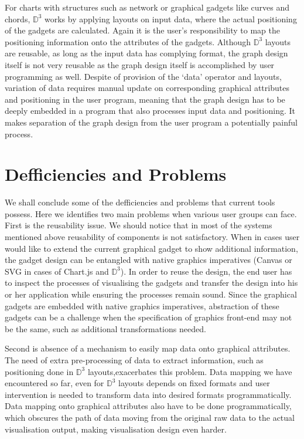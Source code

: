 \documentclass[11pt, a4paper]{report}
\begin{document}
For charts with structures such as network or graphical gadgets like curves and chords, $\mathbb D^3$ works by applying layouts on input data, where the actual positioning of the gadgets are calculated. Again it is the user's responsibility to map the positioning information onto the attributes of the gadgets. Although $\mathbb D^3$ layouts are reusable, as long as the input data has complying format, the graph design itself is not very reusable as the graph design itself is accomplished by user programming as well. Despite of provision of the `data' operator and layouts, variation of data requires manual update on corresponding graphical attributes and positioning in the user program, meaning that the graph design has to be deeply embedded in a program that also processes input data and positioning. It makes separation of the graph design from the user program a potentially painful process. 

\section{Defficiencies and Problems}
We shall conclude some of the defficiencies and problems that current tools possess. Here we identifies two main problems when various user groups can face. First is the reusability issue. We should notice that in most of the systems mentioned above reusability of components is not satisfactory. When in cases user would like to extend the current graphical gadget to show additional information, the gadget design can be entangled with native graphics imperatives (Canvas or SVG in cases of Chart.js and $\mathbb D^3$). In order to reuse the design, the end user has to inspect the processes of visualising the gadgets and transfer the design into his or her application while ensuring the processes remain sound. Since the graphical gadgets are embedded with native graphics imperatives, abstraction of these gadgets can be a challenge when the specification of graphics front-end may not be the same, such as additional transformations needed.

Second is absence of a mechanism to easily map data onto graphical attributes. The need of extra pre-processing of data to extract information, such as positioning done in $\mathbb D^3$ layouts,exacerbates this problem. Data mapping we have encountered so far, even for $\mathbb D^3$ layouts depends on fixed formats and user intervention is needed to transform data into desired formats programmatically. Data mapping onto graphical attributes also have to be done programmatically, which obscures the path of data moving from the original raw data to the actual visualisation output, making visualisation design even harder.
\end{document}
